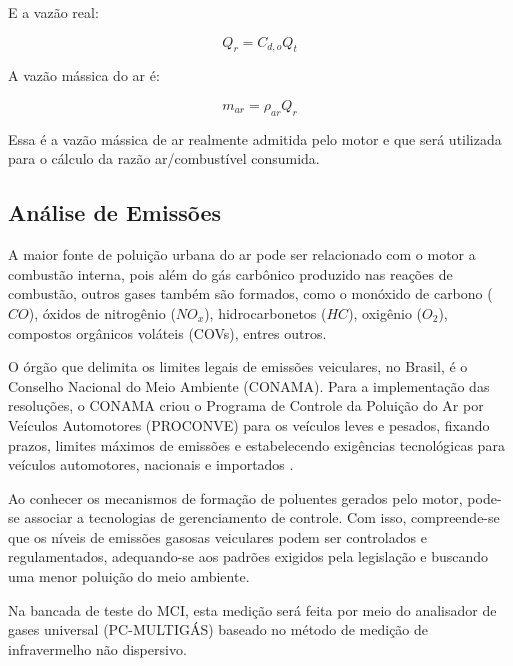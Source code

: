 E a vazão real:

\begin{equation}
	Q_{r} = C_{d,o}Q_{t}
\end{equation}

A vazão mássica do ar é:

\begin{equation}
	m_{ar} = \rho _{ar}Q_{r}
\end{equation}

Essa é a vazão mássica de ar realmente admitida pelo motor  e que será utilizada para o cálculo da razão ar/combustível consumida.

\subsection{Análise de Emissões}

A maior fonte de poluição urbana do ar pode ser relacionado com o motor a combustão interna, pois além do gás carbônico produzido nas reações de combustão, outros gases também são formados, como  o monóxido de carbono ($CO$), óxidos de nitrogênio ($NO_{x}$), hidrocarbonetos ($HC$), oxigênio ($O_{2}$), compostos orgânicos voláteis (COVs), entres outros.

O órgão que delimita os limites legais de emissões veiculares, no Brasil, é o Conselho Nacional do Meio Ambiente (CONAMA). Para a implementação das resoluções, o CONAMA criou o Programa de Controle da Poluição do Ar por Veículos Automotores (PROCONVE) para os veículos leves e pesados, fixando prazos, limites máximos de emissões e estabelecendo exigências tecnológicas para veículos automotores, nacionais e importados \cite{energiaAvaliacao}.

Ao conhecer os mecanismos de formação de poluentes gerados pelo motor, pode-se associar a tecnologias de gerenciamento de controle. Com isso, compreende-se que os níveis de emissões gasosas veiculares podem ser controlados e regulamentados, adequando-se aos padrões exigidos pela legislação e buscando uma menor poluição do meio ambiente.

Na bancada de teste do MCI, esta medição será feita por meio do analisador de gases universal (PC-MULTIGÁS) baseado no método de medição de infravermelho não dispersivo.

